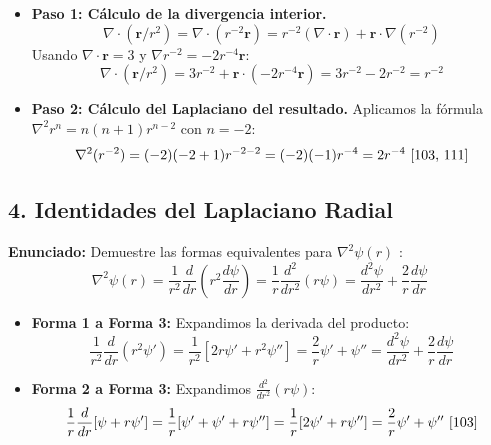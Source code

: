 \documentclass[a4paper]{article}
\begin{document}
\begin{itemize}
    \item \textbf{Paso 1: Cálculo de la divergencia interior.}
    \begin{equation*}
        \nabla \cdot (\mathbf{r}/r^2) = \nabla \cdot (r^{-2} \mathbf{r}) = r^{-2}(\nabla \cdot \mathbf{r}) + \mathbf{r} \cdot \nabla(r^{-2})
    \end{equation*}
    Usando $\nabla \cdot \mathbf{r} = 3$ y $\nabla r^{-2} = -2r^{-4}\mathbf{r}$:
    \begin{equation*}
        \nabla \cdot (\mathbf{r}/r^2) = 3r^{-2} + \mathbf{r} \cdot (-2r^{-4}\mathbf{r}) = 3r^{-2} - 2r^{-2} = r^{-2}
    \end{equation*}
    \item \textbf{Paso 2: Cálculo del Laplaciano del resultado.} Aplicamos la fórmula $\nabla^2 r^n = n(n+1)r^{n-2}$ con $n = -2$:
    \begin{equation*}
        \nabla^2 (r^{-2}) = (-2)(-2+1)r^{-2-2} = (-2)(-1)r^{-4} = 2r^{-4} \text{ \cite{103, 111}}
    \end{equation*}
\end{itemize}

\subsection*{4. Identidades del Laplaciano Radial}
\textbf{Enunciado:} Demuestre las formas equivalentes para $\nabla^2 \psi(r)$ \cite{103}:
\begin{equation*}
    \nabla^2 \psi(r) = \frac{1}{r^2} \frac{d}{dr} \left( r^2 \frac{d\psi}{dr} \right) = \frac{1}{r} \frac{d^2}{dr^2}(r\psi) = \frac{d^2\psi}{dr^2} + \frac{2}{r} \frac{d\psi}{dr}
\end{equation*}

\begin{itemize}
    \item \textbf{Forma 1 a Forma 3:} Expandimos la derivada del producto:
    \begin{equation*}
        \frac{1}{r^2} \frac{d}{dr} \left( r^2 \psi' \right) = \frac{1}{r^2} [2r \psi' + r^2 \psi''] = \frac{2}{r} \psi' + \psi'' = \frac{d^2\psi}{dr^2} + \frac{2}{r} \frac{d\psi}{dr}
    \end{equation*}
    \item \textbf{Forma 2 a Forma 3:} Expandimos $\frac{d^2}{dr^2}(r\psi)$:
    \begin{equation*}
        \frac{1}{r} \frac{d}{dr} [\psi + r \psi'] = \frac{1}{r} [\psi' + \psi' + r \psi''] = \frac{1}{r} [2\psi' + r \psi''] = \frac{2}{r} \psi' + \psi'' \text{ \cite{103}}
    \end{equation*}
\end{itemize}
\end{document}
